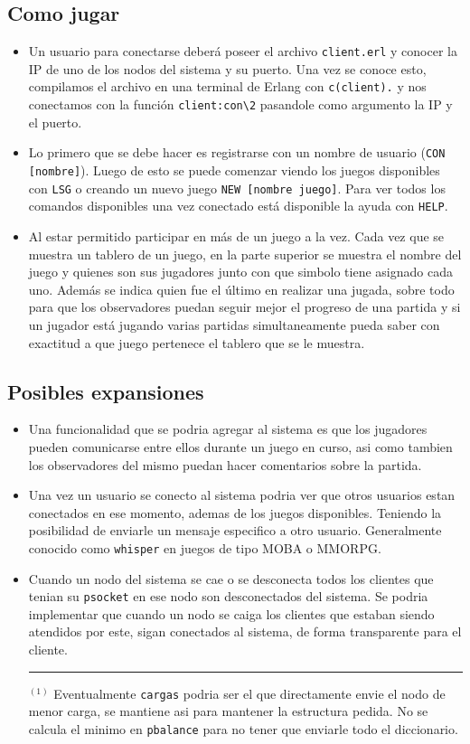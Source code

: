 \documentclass[a4paper]{article}
\newcommand{\blacktr}[0]{\item[$\blacktriangleright$]}
\begin{document}
\subsection*{Como jugar}
\begin{itemize}
   \blacktr Un usuario para conectarse deberá poseer el archivo \texttt{client.erl} y conocer la IP de uno de los nodos del sistema y su puerto. Una vez se conoce esto, compilamos el archivo en una terminal de Erlang con \texttt{c(client).} y nos conectamos con la función \texttt{client:con\textbackslash2} pasandole como argumento la IP y el puerto. 
  
  \blacktr Lo primero que se debe hacer es registrarse con un nombre de usuario (\texttt{CON [nombre]}). Luego de esto se puede comenzar viendo los juegos disponibles con \texttt{LSG} o creando un nuevo juego \texttt{NEW [nombre juego]}. Para ver todos los comandos disponibles una vez conectado está disponible la ayuda con \texttt{HELP}.

  \blacktr Al estar permitido participar en más de un juego a la vez. Cada vez que se muestra un tablero de un juego, en la parte superior se muestra el nombre del juego y quienes son sus jugadores junto con que simbolo tiene asignado cada uno. Además se indica quien fue el último en realizar una jugada, sobre todo para que los observadores puedan seguir mejor el progreso de una partida y si un jugador está jugando varias partidas simultaneamente pueda saber con exactitud a que juego pertenece el tablero que se le muestra.
\end{itemize}

\subsection*{Posibles expansiones}
\begin{itemize}
  \blacktr Una funcionalidad que se podria agregar al sistema es que los jugadores pueden comunicarse entre ellos durante un juego en curso, asi como tambien los observadores del mismo puedan hacer comentarios sobre la partida.

  \blacktr Una vez un usuario se conecto al sistema podria ver que otros usuarios estan conectados en ese momento, ademas de los juegos disponibles. Teniendo la posibilidad de enviarle un mensaje especifico a otro usuario. Generalmente conocido como \texttt{whisper} en juegos de tipo MOBA o MMORPG.

  \blacktr Cuando un nodo del sistema se cae o se desconecta todos los clientes que tenian su \texttt{psocket} en ese nodo son desconectados del sistema. Se podria implementar que cuando un nodo se caiga los clientes que estaban siendo atendidos por este, sigan conectados al sistema, de forma transparente para el cliente.




\rule{18cm}{0.4pt}
$^{(1)}$ Eventualmente \texttt{cargas} podria ser el que directamente envie el nodo de menor carga, se mantiene asi para mantener la estructura pedida. No se calcula el minimo en \texttt{pbalance} para no tener que enviarle todo el diccionario.
\end{itemize}
\end{document}
